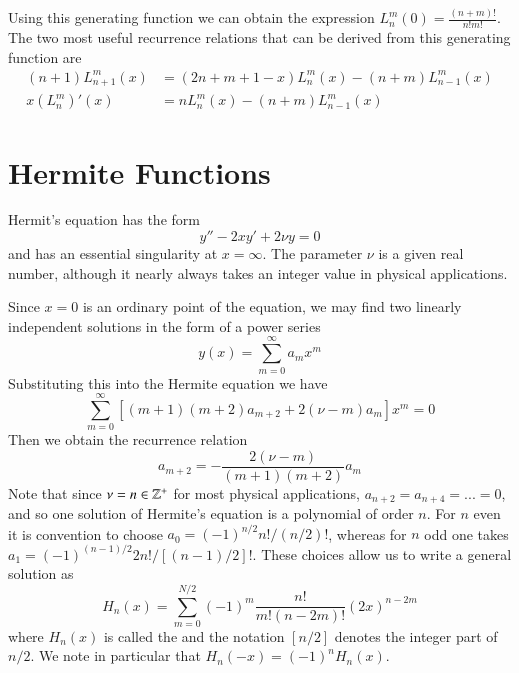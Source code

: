 \documentclass[12pt, a4paper, oneside, openright, titlepage]{book}
\begin{document}
Using this generating function we can obtain the expression $L_n^m(0) = \frac{(n+m)!}{n!m!}$. The two most useful recurrence relations that can be derived from this generating function are \begin{align*}
    (n+1)L_{n+1}^m(x) &= (2n+m+1-x)L_n^m(x) - (n+m)L_{n-1}^m(x) \\
    x(L_n^m)'(x) &= nL_n^m(x) - (n+m)L_{n-1}^m(x)
\end{align*}







\chapter{Hermite Functions}

\begin{defn}
    Hermit's equation has the form \begin{equation*}
        y'' - 2xy' + 2\nu y=0
    \end{equation*}
    and has an essential singularity at $x = \infty$. The parameter $\nu$ is a given real number, although it nearly always takes an integer value in physical applications.
\end{defn}

Since $x = 0$ is an ordinary point of the equation, we may find two linearly independent solutions in the form of a power series \begin{equation*}
    y(x) = \sum_{m=0}^{\infty}a_mx^m
\end{equation*}
Substituting this into the Hermite equation we have \begin{equation*}
    \sum_{m=0}^{\infty}\left[(m+1)(m+2)a_{m+2}+2(\nu-m)a_m\right]x^m = 0
\end{equation*}
Then we obtain the recurrence relation \begin{equation*}
    a_{m+2} = -\frac{2(\nu - m)}{(m+1)(m+2)}a_m
\end{equation*}
Note that since $\nu = n \in \mathbb Z^+$ for most physical applications, $a_{n+2}=a_{n+4}=...=0$, and so one solution of Hermite's equation is a polynomial of order $n$. For $n$ even it is convention to choose $a_0 = (-1)^{n/2}n!/(n/2)!$, whereas for $n$ odd one takes $a_1 = (-1)^{(n-1)/2}2n!/[(n-1)/2]!$. These choices allow us to write a general solution as \begin{equation*}
    H_n(x) = \sum_{m=0}^{N/2}(-1)^m \frac{n!}{m!(n-2m)!}(2x)^{n-2m}
\end{equation*}
where $H_n(x)$ is called the  and the notation $[n/2]$ denotes the integer part of $n/2$. We note in particular that $H_n(-x) = (-1)^nH_n(x)$.
\end{document}
